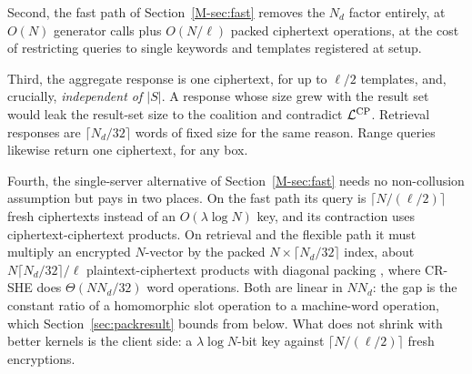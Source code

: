 \documentclass[11pt,a4paper]{article}
\newcommand{\mref}[1]{\ref{M-#1}}
\begin{document}
Second, the fast path of Section~\mref{sec:fast} removes the $N_d$ factor
entirely, at $O(N)$ generator calls plus $O(N/\ell)$ packed ciphertext
operations, at the cost of restricting queries to single keywords and
templates registered at setup.

Third, the aggregate response is one ciphertext, for up to $\ell/2$ templates,
and, crucially, \emph{independent of $|S|$}. A response whose size grew with the result set
would leak the result-set size to the coalition and contradict
$\mathcal{L}^{\text{CP}}$. Retrieval responses are $\lceil N_d/32\rceil$ words of
fixed size for the same reason. Range queries likewise return one ciphertext,
for any box.

Fourth, the single-server alternative of Section~\mref{sec:fast} needs no
non-collusion assumption but pays in two places. On the fast path its query is
$\lceil N/(\ell/2)\rceil$ fresh ciphertexts instead of an $O(\lambda\log N)$
key, and its contraction uses ciphertext-ciphertext products. On retrieval and
the flexible path it must multiply an encrypted $N$-vector by the packed
$N\times\lceil N_d/32\rceil$ index, about $N\lceil N_d/32\rceil/\ell$
plaintext-ciphertext products with diagonal packing
\citep{halevi2014algorithms}, where CR-SHE does $\Theta(NN_d/32)$ word
operations. Both are linear in $NN_d$: the gap is the constant ratio of a
homomorphic slot operation to a machine-word operation, which
Section~\ref{sec:packresult} bounds from below. What does not shrink with
better kernels is the client side: a $\lambda\log N$-bit key against
$\lceil N/(\ell/2)\rceil$ fresh encryptions.
\end{document}
